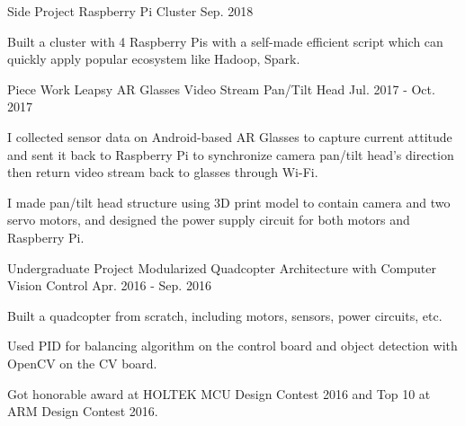 

\begin{cventries}

  \cventry
    {Side Project} %
    {Raspberry Pi Cluster} %
    {} %
    {Sep. 2018} %
    {
      \begin{cvitems} %
        \item {Built a cluster with 4 Raspberry Pis with a self-made efficient script which can quickly apply popular ecosystem like Hadoop, Spark.}
      \end{cvitems}
    }

  \cventry
    {Piece Work} %
    {Leapsy AR Glasses Video Stream Pan/Tilt Head} %
    {} %
    {Jul. 2017 - Oct. 2017} %
    {
      \begin{cvitems} %
        \item {I collected sensor data on Android-based AR Glasses to capture current attitude and sent it back to Raspberry Pi to synchronize camera pan/tilt head’s direction then return video stream back to glasses through Wi-Fi.}
        \item {I made pan/tilt head structure using 3D print model to contain camera and two servo motors, and designed the power supply circuit for both motors and Raspberry Pi.}
      \end{cvitems}
    }

  \cventry
    {Undergraduate Project} %
    {Modularized Quadcopter Architecture with Computer Vision Control} %
    {} %
    {Apr. 2016 - Sep. 2016} %
    {
      \begin{cvitems} %
        \item {Built a quadcopter from scratch, including motors, sensors, power circuits, etc.}
        \item {Used PID for balancing algorithm on the control board and object detection with OpenCV on the CV board.}
        \item {Got honorable award at HOLTEK MCU Design Contest 2016 and Top 10 at ARM Design Contest 2016.}
      \end{cvitems}
    }

\end{cventries}
